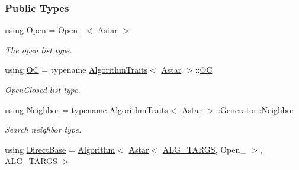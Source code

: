 \subsubsection*{Public Types}
\begin{DoxyCompactItemize}
\item 
using \hyperlink{structalgorithm_1_1Astar_aabcb905343750b0dd6864a67b3df4979}{Open} = Open\+\_\+$<$ \hyperlink{structalgorithm_1_1Astar}{Astar} $>$\hypertarget{structalgorithm_1_1Astar_aabcb905343750b0dd6864a67b3df4979}{}\label{structalgorithm_1_1Astar_aabcb905343750b0dd6864a67b3df4979}

\begin{DoxyCompactList}\small\item\em The open list type. \end{DoxyCompactList}\item 
using \hyperlink{structalgorithm_1_1Astar_a6a2d412041da0eb508a6940db37c0e32}{OC} = typename \hyperlink{classalgorithm_1_1AlgorithmTraits}{Algorithm\+Traits}$<$ \hyperlink{structalgorithm_1_1Astar}{Astar} $>$\+::\hyperlink{structalgorithm_1_1Astar_a6a2d412041da0eb508a6940db37c0e32}{OC}\hypertarget{structalgorithm_1_1Astar_a6a2d412041da0eb508a6940db37c0e32}{}\label{structalgorithm_1_1Astar_a6a2d412041da0eb508a6940db37c0e32}

\begin{DoxyCompactList}\small\item\em Open\+Closed list type. \end{DoxyCompactList}\item 
using \hyperlink{structalgorithm_1_1Astar_ad0466381ac4e8a67573928a1880b5b6d}{Neighbor} = typename \hyperlink{classalgorithm_1_1AlgorithmTraits}{Algorithm\+Traits}$<$ \hyperlink{structalgorithm_1_1Astar}{Astar} $>$\+::Generator\+::\+Neighbor\hypertarget{structalgorithm_1_1Astar_ad0466381ac4e8a67573928a1880b5b6d}{}\label{structalgorithm_1_1Astar_ad0466381ac4e8a67573928a1880b5b6d}

\begin{DoxyCompactList}\small\item\em Search neighbor type. \end{DoxyCompactList}\item 
using \hyperlink{structalgorithm_1_1Astar_af111bb1ad9f8e76f06ca0aa3c1b9944d}{Direct\+Base} = \hyperlink{structalgorithm_1_1Algorithm}{Algorithm}$<$ \hyperlink{structalgorithm_1_1Astar}{Astar}$<$ \hyperlink{algorithm_8h_a425b5a86fe8dae889a8343e14267c3c0}{A\+L\+G\+\_\+\+T\+A\+R\+GS}, Open\+\_\+ $>$, \hyperlink{algorithm_8h_a425b5a86fe8dae889a8343e14267c3c0}{A\+L\+G\+\_\+\+T\+A\+R\+GS} $>$\hypertarget{structalgorithm_1_1Astar_af111bb1ad9f8e76f06ca0aa3c1b9944d}{}\label{structalgorithm_1_1Astar_af111bb1ad9f8e76f06ca0aa3c1b9944d}


\end{DoxyCompactItemize}
